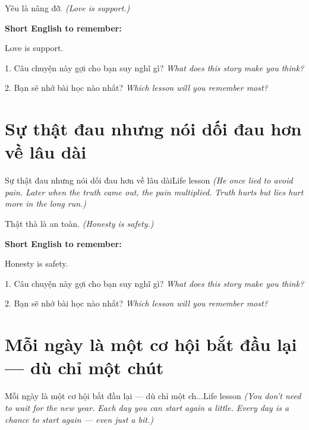 \begin{baihoc}
Yêu là nâng đỡ.
\textit{(Love is support.)}
\end{baihoc}

\begin{ghinhoanh}
\textbf{Short English to remember:}

Love is support.

\end{ghinhoanh}

\begin{tuhocnhanh}
1. Câu chuyện này gợi cho bạn suy nghĩ gì? \textit{What does this story make you think?}

2. Bạn sẽ nhớ bài học nào nhất? \textit{Which lesson will you remember most?}
\end{tuhocnhanh}
\ngancach


\section{Sự thật đau nhưng nói dối đau hơn về lâu dài}
\begin{truyen}{Sự thật đau nhưng nói dối đau hơn về lâu dài}{Life lesson}
\textit{(He once lied to avoid pain. Later when the truth came out, the pain multiplied. Truth hurts but lies hurt more in the long run.)}
\end{truyen}

\begin{baihoc}
Thật thà là an toàn.
\textit{(Honesty is safety.)}
\end{baihoc}

\begin{ghinhoanh}
\textbf{Short English to remember:}

Honesty is safety.

\end{ghinhoanh}

\begin{tuhocnhanh}
1. Câu chuyện này gợi cho bạn suy nghĩ gì? \textit{What does this story make you think?}

2. Bạn sẽ nhớ bài học nào nhất? \textit{Which lesson will you remember most?}
\end{tuhocnhanh}
\ngancach


\section{Mỗi ngày là một cơ hội bắt đầu lại — dù chỉ một chút}
\begin{truyen}{Mỗi ngày là một cơ hội bắt đầu lại — dù chỉ một ch...}{Life lesson}
\textit{(You don't need to wait for the new year. Each day you can start again a little. Every day is a chance to start again — even just a bit.)}
\end{truyen}

